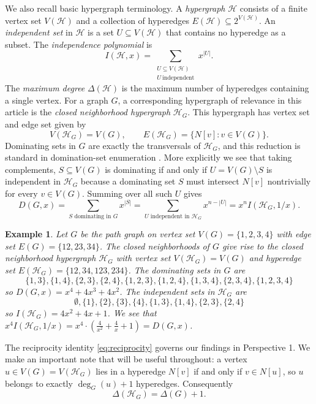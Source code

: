 \documentclass[11pt]{amsart}
\newtheorem{example}[theorem]{Example}
\numberwithin{equation}{section}
\newcommand{\VV}{V(G)}
\newcommand{\EE}{E(G)}
\newcommand{\HH}{\mathcal{H}}
\begin{document}
We also recall basic hypergraph terminology. A \emph{hypergraph} $\HH$ consists of a finite vertex set $V(\HH)$ and a collection of hyperedges $E(\HH)\subseteq 2^{V(\HH)}$. An \emph{independent set} in $\HH$ is a set $U\subseteq V(\HH)$ that contains no hyperedge as a subset. The \emph{independence polynomial} is
\[
I(\HH,x)=\sum_{\substack{U\subseteq V(\HH)\\ U\ \text{independent}}} x^{|U|}.
\]
The \emph{maximum degree} $\Delta(\HH)$ is the maximum number of hyperedges containing a single vertex. For a graph $G$, a corresponding hypergraph of relevance in this article is the \emph{closed neighborhood hypergraph} $\HH_G$. This hypergraph has vertex set and edge set given by
\[
V(\HH_G)=\VV,\qquad E(\HH_G)=\{N[v]:v\in\VV\}.
\]
Dominating sets in $G$ are exactly the transversals of $\HH_G$, and this reduction is standard in domination-set enumeration \cite{Kante2014}. More explicitly we see that taking complements, $S\subseteq\VV$ is dominating if and only if $U=\VV\setminus S$ is independent in $\HH_G$ because a dominating set $S$ must intersect $N[v]$ nontrivially for every $v \in \VV$. Summing over all such $U$ gives
\begin{equation}\label{eq:reciprocity}
D(G,x)=\sum_{S \text{ dominating in } G} x^{|S|} = \sum_{U \text{ independent in } \HH_G} x^{n-|U|} = x^n I(\HH_G,1/x).
\end{equation}

\begin{example}
Let $G$ be the path graph on vertex set $\VV=\{1,2,3,4\}$ with edge set $\EE=\{12,23,34\}$. The closed neighborhoods of $G$ give rise to the closed neighborhood hypergraph $\HH_G$ with vertex set $V(\HH_G)=\VV$ and hyperedge set $E(\HH_G)=\{12,34,123,234\}$. The dominating sets in $G$ are 
\[
\{1,3\},\{1,4\},\{2,3\},\{2,4\},\{1,2,3\},\{1,2,4\},\{1,3,4\},\{2,3,4\},\{1,2,3,4\}
\]
so $D(G,x)=x^4+4x^3+4x^2$. The independent sets in $\HH_G$ are
\[
\emptyset, \{1\}, \{2\}, \{3\}, \{4\}, \{1,3\}, \{1,4\},\{2,3\},\{2,4\}
\]
so $I(\HH_G)=4x^2+4x+1$. We see that $x^4I(\HH_G,1/x)=x^4 \cdot \left(\frac{4}{x^2}+\frac{4}{x}+1\right)=D(G,x)$.
\end{example}

The reciprocity identity \eqref{eq:reciprocity} governs our findings in Perspective 1. We make an important note that will be useful throughout: a vertex $u\in\VV=V(\HH_G)$ lies in a hyperedge $N[v]$ if and only if $v\in N[u]$, so $u$ belongs to exactly $\deg_G(u)+1$ hyperedges. Consequently
\begin{equation}\label{eq:maxDegHG}
\Delta(\HH_G)=\Delta(G)+1.
\end{equation}
\end{document}
